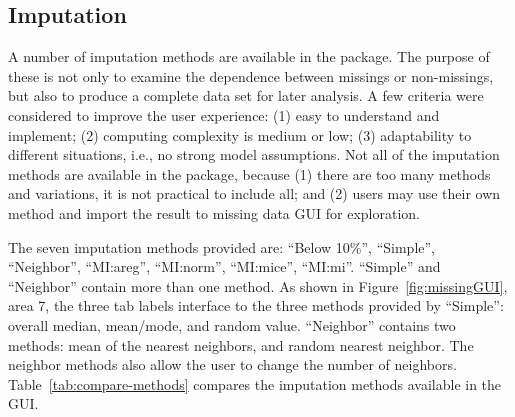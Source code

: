 \documentclass[article]{jss}
\begin{document}
\subsection{Imputation}\label{imputation}

A number of imputation methods are available in the package. The purpose of these is not only to examine the dependence between missings or non-missings, but also to produce a complete data set for later analysis. A few criteria were considered to improve the user experience: (1) easy to understand and implement; (2) computing complexity is medium or low; (3) adaptability to different situations, i.e., no strong model assumptions. Not all of the imputation methods are available in the package, because (1) there are too many methods and variations, it is not practical to include all; and (2) users may use their own method and import the result to missing data GUI for exploration.

The seven imputation methods provided are: 
``Below 10\%'', ``Simple'', ``Neighbor'', ``MI:areg'', ``MI:norm'', ``MI:mice'', ``MI:mi''. 
``Simple'' and ``Neighbor'' contain more than one method. As shown in Figure~\ref{fig:missingGUI}, area 7, the three tab labels interface to the three methods provided by ``Simple'': overall median, mean/mode, and random value. ``Neighbor'' contains two methods: mean of the nearest neighbors, and random nearest neighbor. The neighbor methods also allow the user to change the number of neighbors. Table~\ref{tab:compare-methods} compares the imputation methods available in the GUI.
\end{document}

